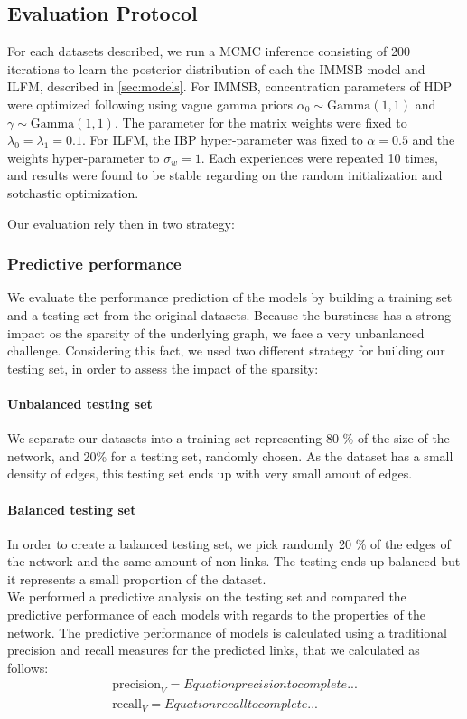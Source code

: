 \subsection{Evaluation Protocol}
For each datasets described,  we run a MCMC inference consisting of 200 iterations to learn the posterior distribution of each the IMMSB model and ILFM, described in \ref{sec:models}. For IMMSB, concentration parameters of HDP were optimized following \cite{HDP} using vague gamma priors $\alpha_0 \sim \text{Gamma}(1,1)$ and $\gamma \sim \text{Gamma}(1,1)$. The parameter for the matrix weights were fixed to $\lambda_0=\lambda_1=0.1$. For ILFM, the IBP hyper-parameter was fixed to $\alpha=0.5$ and the weights hyper-parameter to $\sigma_w = 1$. Each experiences were repeated 10 times, and results were found to be stable regarding on the random initialization and sotchastic optimization.

Our evaluation rely then in two strategy:


\subsubsection{Predictive performance}
We evaluate the performance prediction of the models by building a training set and a testing set from the original datasets. Because the burstiness has a strong impact os the sparsity of the underlying graph, we face a very unbanlanced challenge. Considering this fact, we used two different strategy for building our testing set, in order to assess the impact of the sparsity:

\paragraph{Unbalanced testing set}
We separate our datasets into a training set representing 80 \% of the size of the network, and 20\% for a testing set, randomly chosen. As the dataset has a small density of edges, this testing set ends up with very small amout of edges.

\paragraph{Balanced testing set}
In order to create a balanced testing set, we pick randomly 20 \% of the edges of the network and the same amount of non-links. The testing ends up balanced but it represents a small proportion of the dataset.~\\


We performed a predictive analysis on the testing set and compared the predictive performance of each models with regards to the properties of the network. 
The predictive performance of models is calculated using a traditional precision and recall measures for the predicted links, that we calculated as follows:\\
\begin{align}
    \mathrm{precision}_{V} = Equation precision to complete... \\
    \mathrm{recall}_{V} = Equation recall to complete...
\end{align}


